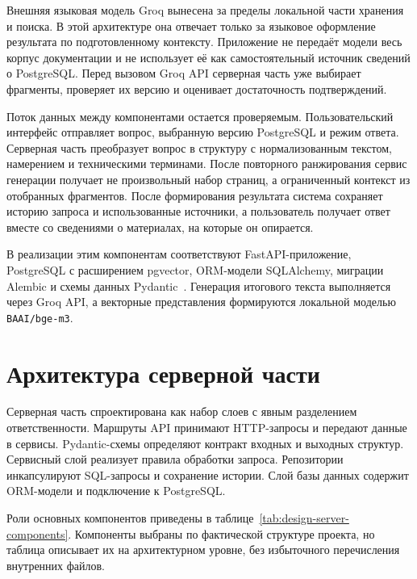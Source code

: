 Внешняя языковая модель Groq вынесена за пределы локальной части хранения и поиска. В этой архитектуре она отвечает только за языковое оформление результата по подготовленному контексту. Приложение не передаёт модели весь корпус документации и не использует её как самостоятельный источник сведений о PostgreSQL. Перед вызовом Groq API серверная часть уже выбирает фрагменты, проверяет их версию и оценивает достаточность подтверждений.

Поток данных между компонентами остается проверяемым. Пользовательский интерфейс отправляет вопрос, выбранную версию PostgreSQL и режим ответа. Серверная часть преобразует вопрос в структуру с нормализованным текстом, намерением и техническими терминами. После повторного ранжирования сервис генерации получает не произвольный набор страниц, а ограниченный контекст из отобранных фрагментов. После формирования результата система сохраняет историю запроса и использованные источники, а пользователь получает ответ вместе со сведениями о материалах, на которые он опирается.

В реализации этим компонентам соответствуют FastAPI-приложение, PostgreSQL с расширением pgvector, ORM-модели SQLAlchemy, миграции Alembic и схемы данных Pydantic~\cite{fastapi-docs,pydantic-docs,sqlalchemy-docs,alembic-docs,pgvector}. Генерация итогового текста выполняется через Groq API, а векторные представления формируются локальной моделью \texttt{BAAI/bge-m3}.

\section{Архитектура серверной части}

Серверная часть спроектирована как набор слоев с явным разделением ответственности. Маршруты API принимают HTTP-запросы и передают данные в сервисы. Pydantic-схемы определяют контракт входных и выходных структур. Сервисный слой реализует правила обработки запроса. Репозитории инкапсулируют SQL-запросы и сохранение истории. Слой базы данных содержит ORM-модели и подключение к PostgreSQL.

Роли основных компонентов приведены в таблице~\ref{tab:design-server-components}. Компоненты выбраны по фактической структуре проекта, но таблица описывает их на архитектурном уровне, без избыточного перечисления внутренних файлов.

